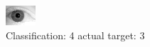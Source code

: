 \begin{figure}[h!]
\begin{center}
\includegraphics[width=0.60\columnwidth]{figures/ID2159_class_4_target_3.png}
\end{center}
\caption{ Classification: 4 actual target: 3}
\label{fig:ID2159_class_4_target_3}
\end{figure}
